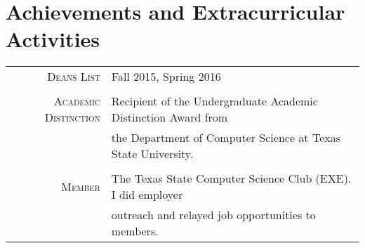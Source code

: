 \documentclass[a4paper,10pt]{article}
\begin{document}
\section{Achievements and Extracurricular Activities}
\begin{tabular}{rl}
 \textsc{Deans List} & Fall 2015, Spring 2016 \\

& \\
\textsc{Academic Distinction} & Recipient of the Undergraduate Academic Distinction Award from \\ & the Department of Computer Science at Texas State University. \\

& \\
\textsc{Member} & The Texas State Computer Science Club (EXE). I did employer \\
	& outreach and relayed job opportunities to members. \\
\end{tabular}

\end{document}
